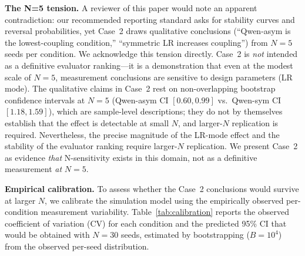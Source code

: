 \documentclass[11pt]{article}
\begin{document}
\textbf{The N{=}5 tension.} A reviewer of this paper would note an apparent contradiction: our recommended reporting standard asks for stability curves and reversal probabilities, yet Case~2 draws qualitative conclusions (``Qwen-asym is the lowest-coupling condition,'' ``symmetric LR increases coupling'') from $N{=}5$ seeds per condition. We acknowledge this tension directly. Case~2 is \emph{not} intended as a definitive evaluator ranking---it is a demonstration that even at the modest scale of $N{=}5$, measurement conclusions are sensitive to design parameters (LR mode). The qualitative claims in Case~2 rest on non-overlapping bootstrap confidence intervals at $N{=}5$ (Qwen-asym CI $[0.60, 0.99]$ vs.\ Qwen-sym CI $[1.18, 1.59]$), which are sample-level descriptions; they do not by themselves establish that the effect is detectable at small $N$, and larger-$N$ replication is required. Nevertheless, the precise magnitude of the LR-mode effect and the stability of the evaluator ranking require larger-$N$ replication. We present Case~2 as evidence \emph{that} N-sensitivity exists in this domain, not as a definitive measurement \emph{at} $N{=}5$.

\textbf{Empirical calibration.} To assess whether the Case~2 conclusions would survive at larger $N$, we calibrate the simulation model using the empirically observed per-condition measurement variability. Table~\ref{tab:calibration} reports the observed coefficient of variation (CV) for each condition and the predicted 95\% CI that would be obtained with $N{=}30$ seeds, estimated by bootstrapping ($B{=}10^4$) from the observed per-seed distribution.
\end{document}
